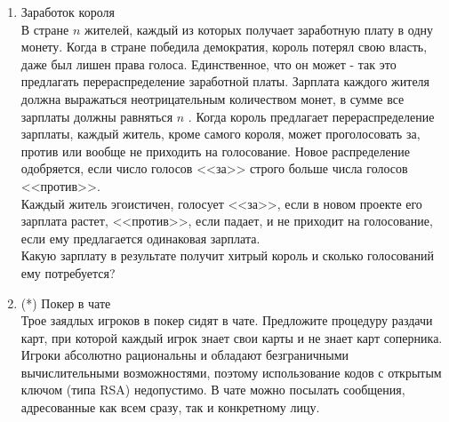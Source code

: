 \documentclass[pdftex,12pt,a4paper]{article}
\begin{document}
\begin{enumerate}


\item Заработок короля\\
В стране  $n$  жителей, каждый из которых получает заработную плату в одну монету. Когда в стране победила демократия, король потерял свою власть, даже был лишен права голоса. Единственное, что он может - так это предлагать перераспределение заработной платы. Зарплата каждого жителя должна выражаться неотрицательным количеством монет, в сумме все зарплаты должны равняться  $n$ . Когда король предлагает перераспределение зарплаты, каждый житель, кроме самого короля, может проголосовать за, против или вообще не приходить на голосование. Новое распределение одобряется, если число голосов <<за>> строго больше числа голосов <<против>>.\\
Каждый житель эгоистичен, голосует <<за>>, если в новом проекте его зарплата растет, <<против>>, если падает, и не приходит на голосование, если ему предлагается одинаковая зарплата.\\
Какую зарплату в результате получит хитрый король и сколько голосований ему потребуется?

\item (*) Покер в чате\\
Трое заядлых игроков в покер сидят в чате. Предложите процедуру раздачи карт, при которой каждый игрок знает свои карты и не знает карт соперника. Игроки абсолютно рациональны и обладают безграничными вычислительными возможностями, поэтому использование кодов с открытым ключом (типа RSA) недопустимо. В чате можно посылать сообщения, адресованные как всем сразу, так и конкретному лицу.


\end{enumerate}
\end{document}
